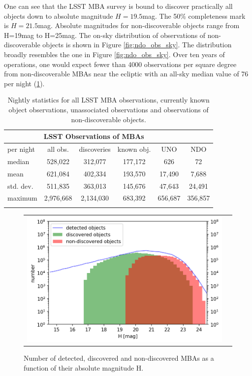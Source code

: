 One can see that the \gls{LSST} MBA survey is bound to discover practically all objects down to absolute magnitude $H=19.5$mag. The 50\% completeness mark is $H=21.5$mag.
Absolute magnitudes for non-discoverable objects range from H=19mag to H=25mag.
The on-sky distribution of observations of non-discoverable objects is shown in Figure \ref{fig:ndo_obs_sky}. The distribution broadly resembles the one in Figure \ref{fig:ndo_obs_sky}. Over ten years of operations, one would expect fewer than 4000 observations per square degree from non-discoverable MBAs near the ecliptic with an all-sky median value of 76 per night (\ref{tab:obs_stats}).   
%
\begin{table}[tb!]
\begin{center}
\begin{tabular}{lccccc}
\multicolumn{5}{c}{LSST Observations of MBAs}\\
\hline\hline
per night & all obs. & discoveries & known obj. & \gls{UNO} & \gls{NDO} \\\hline
median  & 528,022 &312,077  &177,172 &626 &72 \\
mean & 621,084 & 402,334 & 193,570 & 17,490 & 7,688 \\
std. dev. & 511,835 & 363,013& 145,676 &47,643 & 24,491\\
maximum & 2,976,668 & 2,134,030 & 683,392 & 656,687 & 356,857\\
\hline\hline\\
\end{tabular}
\end{center}
\caption{Nightly statistics for all \gls{LSST} MBA observations, currently known object observations, unassociated observations and observations of
non-discoverable objects.}
\label{tab:obs_stats}
\end{table}
%

\begin{figure}[tb!]
\begin{center}
\begin{tabular}{cc}
\includegraphics[width=0.70\linewidth]{figs/detection_discovered2.png}
\end{tabular}
\end{center}
\caption{Number of detected, discovered and non-discovered MBAs as a function of their absolute magnitude H. }
\label{fig:ndo_h}       %
\end{figure}

